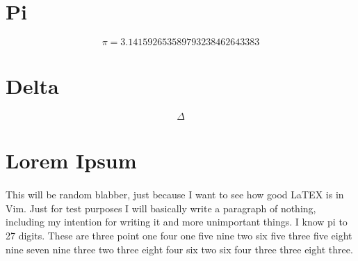 \documentclass[letterpaper, 12pt]{article}
\begin{document}
\tableofcontents
\newpage

\section{Pi}
\[ \pi = 3.141592653589793238462643383 \]
\newpage

\section{Delta}
\[ \Delta \]
\newpage

\section{Lorem Ipsum}
\paragraph{}
This will be random blabber, just because I want to see how good LaTEX is in
Vim. Just for test purposes I will basically write a paragraph of nothing,
including my intention for writing it and more unimportant things. I know pi to
27 digits. These are three point one four one five nine two six five three five
   eight nine seven nine three two three eight four six two six four three three
   eight three.
\end{document}

